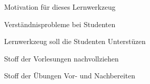 



{
    \begin{itemgroup}{}
	\item Motivation für dieses Lernwerkzeug
		\begin{itemgroup}{}
		\item Verständnisprobleme bei Studenten
		\end{itemgroup}	
		\item Lernwerkzeug soll die Studenten Unterstüzen
			\begin{itemgroup}{}
			\item Stoff der Vorlesungen nachvollziehen
			\item Stoff der Übungen Vor- und Nachbereiten
			\end{itemgroup}
	\end{itemgroup}
    
	\vfill{}
}



